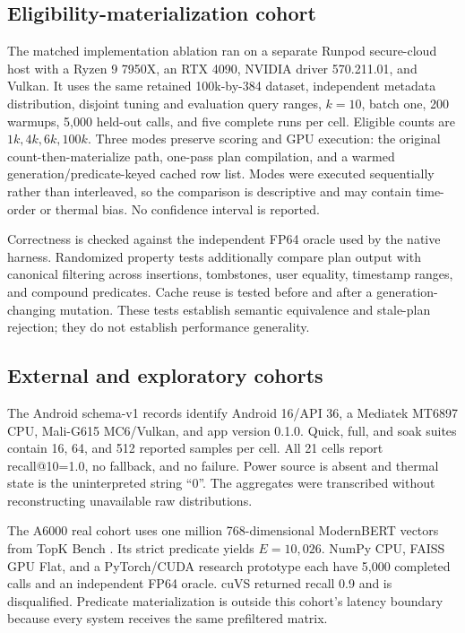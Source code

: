 \documentclass[10pt]{article}
\newcommand{\E}{E}
\begin{document}
\subsection{Eligibility-materialization cohort}
The matched implementation ablation ran on a separate Runpod secure-cloud host with a Ryzen 9 7950X, an RTX 4090, NVIDIA driver 570.211.01, and Vulkan. It uses the same retained 100k-by-384 dataset, independent metadata distribution, disjoint tuning and evaluation query ranges, \(k=10\), batch one, 200 warmups, 5,000 held-out calls, and five complete runs per cell. Eligible counts are \(1k,4k,6k,100k\). Three modes preserve scoring and GPU execution: the original count-then-materialize path, one-pass plan compilation, and a warmed generation/predicate-keyed cached row list. Modes were executed sequentially rather than interleaved, so the comparison is descriptive and may contain time-order or thermal bias. No confidence interval is reported.

Correctness is checked against the independent FP64 oracle used by the native harness. Randomized property tests additionally compare plan output with canonical filtering across insertions, tombstones, user equality, timestamp ranges, and compound predicates. Cache reuse is tested before and after a generation-changing mutation. These tests establish semantic equivalence and stale-plan rejection; they do not establish performance generality.

\subsection{External and exploratory cohorts}
The Android schema-v1 records identify Android 16/API 36, a Mediatek MT6897 CPU, Mali-G615 MC6/Vulkan, and app version 0.1.0. Quick, full, and soak suites contain 16, 64, and 512 reported samples per cell. All 21 cells report recall@10=1.0, no fallback, and no failure. Power source is absent and thermal state is the uninterpreted string ``0''. The aggregates were transcribed without reconstructing unavailable raw distributions.

The A6000 real cohort uses one million 768-dimensional ModernBERT vectors from TopK Bench \citep{topkbench}. Its strict predicate yields \(\E=10{,}026\). NumPy CPU, FAISS GPU Flat, and a PyTorch/CUDA research prototype each have 5,000 completed calls and an independent FP64 oracle. cuVS returned recall 0.9 and is disqualified. Predicate materialization is outside this cohort's latency boundary because every system receives the same prefiltered matrix.
\end{document}
